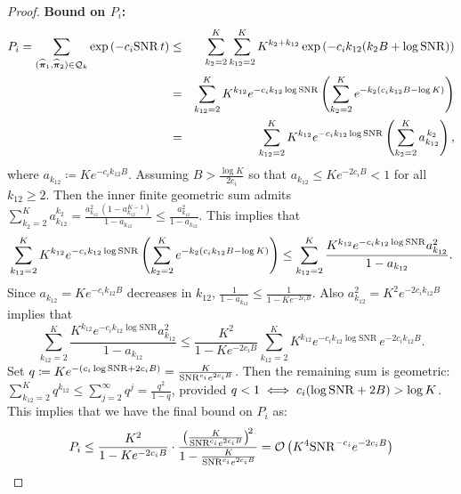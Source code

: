 \documentclass[numsec,webpdf,modern,medium,namedate]{oup-authoring-template}
\theoremstyle{thmstyleone}%
\theoremstyle{thmstyletwo}%
\theoremstyle{thmstylethree}%
\begin{document}
\begin{proof}
\textbf{Bound on $P_i$:}
\begin{eqnarray*}
    P_i = \sum_{(\widehat{\boldsymbol{\pi}}_1, \widehat{\boldsymbol{\pi}}_2 ) \in \mathcal{Q}_k}\exp\left(-c_i\mathrm{SNR} \,t\right) 
    & \leq &\sum_{k_2=2}^K\sum_{k_{12}=2}^K K^{k_2+k_{12}}\exp\left(-c_i k_{12}  (k_2 B + \log \mathrm{SNR})\right) \\
    & = &\sum_{k_{12}=2}^{K} K^{k_{12}} e^{-c_i k_{12}\log\mathrm{SNR}}
    \left(\sum_{k_2=2}^{K} e^{-k_2(c_i k_{12}B-\log K)}\right)\\
    & = & \sum_{k_{12}=2}^{K} K^{k_{12}} e^{-c_i k_{12}\log\mathrm{SNR}}
\left(\sum_{k_2=2}^{K} a_{k_{12}}^{\,k_2}\right), 
\end{eqnarray*}
where $a_{k_{12}}\coloneqq Ke^{-c_i k_{12}B}$.
Assuming  {$B>\tfrac{\log K}{2c_i}$} so that $a_{k_{12}} \leq K e^{-2c_i B}<1$ for all $k_{12}\geq 2$. Then the inner finite geometric sum admits $\sum_{k_2=2}^{K} a_{k_{12}}^{k_2}
= \frac{a_{k_{12}}^{2}\,(1-a_{k_{12}}^{K-1})}{1-a_{k_{12}}}
\leq \frac{a_{k_{12}}^{2}}{1-a_{k_{12}}}$.
This implies that
$$
\sum_{k_{12}=2}^{K} K^{k_{12}} e^{-c_i k_{12}\log\mathrm{SNR}}
\left(\sum_{k_2=2}^{K} e^{-k_2(c_i k_{12}B-\log K)}\right)
\leq
\sum_{k_{12}=2}^{K}
\frac{K^{k_{12}} e^{-c_i k_{12}\log\mathrm{SNR}} a_{k_{12}}^{2}}{1-a_{k_{12}}}.
$$
Since $a_{k_{12}}=K e^{-c_i k_{12}B}$ decreases in $k_{12}$,
$\frac{1}{1-a_{k_{12}}}\le \frac{1}{1-K e^{-2c_i B}}$. Also $a_{k_{12}}^{2}=K^{2}e^{-2c_i k_{12}B}$ implies that 
$$
\sum_{k_{12}=2}^{K}
\frac{K^{k_{12}} e^{-c_i k_{12}\log\mathrm{SNR}} a_{k_{12}}^{2}}{1-a_{k_{12}}}
\leq \frac{K^{2}}{1-K e^{-2c_i B}}
\sum_{k_{12}=2}^{K}
K^{k_{12}} e^{-c_i k_{12}\log\mathrm{SNR}}\, e^{-2c_i k_{12}B}.
$$
Set $q\coloneqq Ke^{-(c_i\log\mathrm{SNR}+2c_i B)}
=\frac{K}{\mathrm{SNR}^{c_i} e^{2c_i B}}$. Then the remaining sum is geometric: $\sum_{k_{12}=2}^{K} q^{k_{12}} \le \sum_{j=2}^{\infty} q^{j}=\frac{q^{2}}{1-q}$, provided $q<1 \iff c_i(\log\mathrm{SNR}+2B)>\log K$. This implies that we have the final bound on $P_i$ as:
$$
P_i \leq \frac{K^2}{1- K e^{-2c_i B}}\cdot
\frac{\big(\tfrac{K}{\mathrm{SNR}^{c_i} e^{2c_i B}}\big)^{\!2}}
{1-\tfrac{K}{\mathrm{SNR}^{c_i} e^{2c_i B}}} = \mathcal{O}\left(K^4 \mathrm{SNR} ^{-c_i}e^{-2c_iB}\right)
$$


\end{proof}
\end{document}
